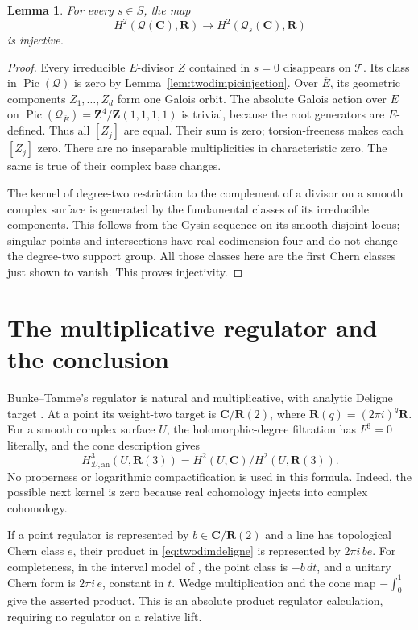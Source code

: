 \documentclass[11pt,a4paper]{article}
\newtheorem{lemma}[theorem]{Lemma}
\theoremstyle{remark}
\newcommand{\Z}{\mathbf Z}
\newcommand{\R}{\mathbf R}
\newcommand{\C}{\mathbf C}
\newcommand{\Pic}{\operatorname{Pic}}
\newcommand{\HD}{H_{\mathcal D,\mathrm{an}}}
\begin{document}
\begin{lemma}\label{lem:twodimbettipersistence}
For every $s\in S$, the map
\[
 H^2(\mathcal Q(\C),\R)\longrightarrow
 H^2(\mathcal Q_s(\C),\R)
\]
is injective.
\end{lemma}
\begin{proof}
Every irreducible $E$-divisor $Z$ contained in $s=0$ disappears on
$\mathcal T$. Its class in $\Pic(\mathcal Q)$ is zero by
Lemma~\ref{lem:twodimpicinjection}. Over $\overline E$, its geometric
components $Z_1,\ldots,Z_d$ form one Galois orbit. The absolute Galois action over $E$ on
$\Pic(\mathcal Q_{\overline E})=\Z^4/\Z(1,1,1,1)$ is trivial,
because the root generators are $E$-defined. Thus all $[Z_j]$ are
equal. Their sum is zero; torsion-freeness makes each $[Z_j]$ zero.
There are no inseparable multiplicities in characteristic zero.
The same is true of their complex base changes.

The kernel of degree-two restriction to the complement of a divisor
on a smooth complex surface is generated by the fundamental classes
of its irreducible components. This follows from the Gysin sequence
on its smooth disjoint locus; singular points and intersections have
real codimension four and do not change the degree-two support group.
All those classes here are the first Chern classes just shown to
vanish. This proves injectivity.
\end{proof}

\section{The multiplicative regulator and the conclusion}

Bunke--Tamme's regulator is natural and multiplicative, with analytic
Deligne target \cite[Remark~2.6 and Theorem~2.31]{BunkeTamme}.
At a point its weight-two target is $\C/\R(2)$, where
$\R(q)=(2\pi i)^q\R$. For a smooth complex surface $U$, the
holomorphic-degree filtration has $F^3=0$ literally, and the cone
description gives
\begin{equation}\label{eq:twodimdeligne}
 \HD^3(U,\R(3))=
 H^2(U,\C)/H^2(U,\R(3)).
\end{equation}
No properness or logarithmic compactification is used in this formula.
Indeed, the possible next kernel is zero because real cohomology
injects into complex cohomology.

If a point regulator is represented by $b\in\C/\R(2)$ and a line
has topological Chern class $e$, their product in
\eqref{eq:twodimdeligne} is represented by $2\pi i\,b e$.
For completeness, in the interval model of
\cite[Definition~2.7, Proposition~2.8 and Corollary~2.14]{BunkeTamme},
the point class is $-b\,dt$, and a unitary Chern form is
$2\pi i\,e$, constant in $t$. Wedge multiplication and the cone map
$-\int_0^1$ give the asserted product. This is an absolute product
regulator calculation, requiring no regulator on a relative lift.
\end{document}
